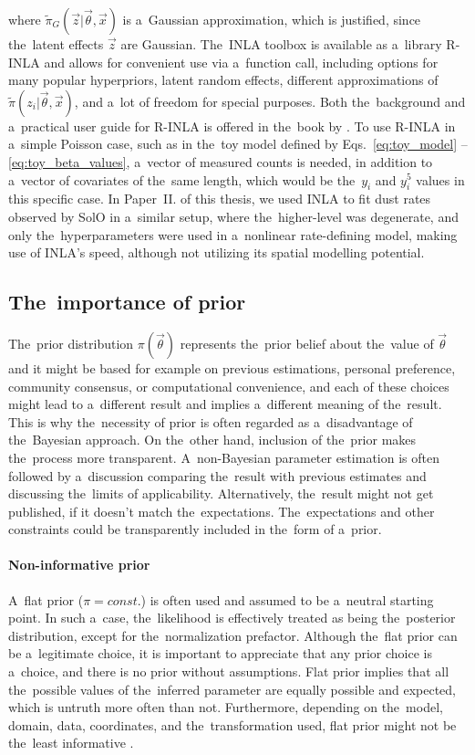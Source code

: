 where $\tilde{\pi}_G(\vec{z}|\vec{\theta},\vec{x})$ is a~Gaussian approximation, which is justified, since the~latent effects $\vec{z}$ are Gaussian. The~INLA toolbox is available as a~library {R-INLA} \citep{rinla} and allows for convenient use via a~function call, including options for many popular hyperpriors, latent random effects, different approximations of $\tilde{\pi}(z_i|\vec{\theta},\vec{x})$, and a~lot of freedom for special purposes. Both the~background and a~practical user guide for R-INLA is offered in the~book by \citet{gomez2020bayesian}. To use R-INLA in a~simple Poisson case, such as in the~toy model defined by Eqs.~\ref{eq:toy_model} -- \ref{eq:toy_beta_values}, a~vector of measured counts is needed, in addition to a~vector of covariates of the~same length, which would be the~$y_i$ and $y_i^5$ values in this specific case. In Paper~II. of this thesis, we used INLA to fit dust rates observed by SolO in a~similar setup, where the~higher-level was degenerate, and only the~hyperparameters were used in a~nonlinear rate-defining model, making use of INLA's speed, although not utilizing its spatial modelling potential. 

\subsection{The~importance of prior}

The~prior distribution $\pi(\vec{\theta})$ represents the~prior belief about the~value of $\vec{\theta}$ and it might be based for example on previous estimations, personal preference, community consensus, or computational convenience, and each of these choices might lead to a~different result and implies a~different meaning of the~result. This is why the~necessity of prior is often regarded as a~disadvantage of the~Bayesian approach. On the~other hand, inclusion of the~prior makes the~process more transparent. A~non-Bayesian parameter estimation is often followed by a~discussion comparing the~result with previous estimates and discussing the~limits of applicability. Alternatively, the~result might not get published, if it doesn't match the~expectations. The~expectations and other constraints could be transparently included in the~form of a~prior.

\paragraph{Non-informative prior} A~flat prior ($\pi = const.$) is often used and assumed to be a~neutral starting point. In such a~case, the~likelihood is effectively treated as being the~posterior distribution, except for the~normalization prefactor. Although the~flat prior can be a~legitimate choice, it is important to appreciate that any prior choice is a~choice, and there is no prior without assumptions. Flat prior implies that all the~possible values of the~inferred parameter are equally possible and expected, which is untruth more often than not. Furthermore, depending on the~model, domain, data, coordinates, and the~transformation used, flat prior might not be the~least informative \citep{lemoine2019moving}.

